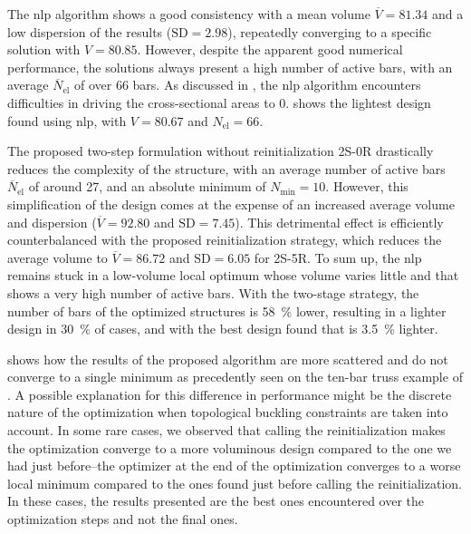 The \gls{nlp} algorithm shows a good consistency with a mean volume $\overline{V}=81.34$ and a low dispersion of the results ($\text{SD}=2.98$), repeatedly converging to a specific solution with $V=80.85$. However, despite the apparent good numerical performance, the solutions always present a high number of active bars, with an average $\overline{N}_{\text{el}}$ of over 66 bars. As discussed in , the \gls{nlp} algorithm encounters difficulties in driving the cross-sectional areas to 0.  shows the lightest design found using \gls{nlp}, with $V = 80.67$ and $N_{\text{el}}=66$.

The proposed two-step formulation without reinitialization 2S-0R drastically reduces the complexity of the structure, with an average number of active bars $\overline{N}_{\text{el}}$ of around 27, and an absolute minimum of $N_{\text{min}}=10$. However, this simplification of the design comes at the expense of an increased average volume and dispersion ($\overline{V}=92.80$ and $\text{SD}=7.45$). This detrimental effect is efficiently counterbalanced with the proposed reinitialization strategy, which reduces the average volume to $\overline{V}=86.72$ and $\text{SD}=6.05$ for 2S-5R. To sum up, the \gls{nlp} remains stuck in a low-volume local optimum whose volume varies little and that shows a very high number of active bars. With the two-stage strategy, the number of bars of the optimized structures is \qty{58}{\%} lower, resulting in a lighter design in \qty{30}{\%} of cases, and with the best design found that is \qty{3.5}{\%} lighter.

 shows how the results of the proposed algorithm are more scattered and do not converge to a single minimum as precedently seen on the ten-bar truss example of . A possible explanation for this difference in performance might be the discrete nature of the optimization when topological buckling constraints are taken into account. In some rare cases, we observed that calling the reinitialization makes the optimization converge to a more voluminous design compared to the one we had just before--\ie the optimizer at the end of the optimization converges to a worse local minimum compared to the ones found just before calling the reinitialization. In these cases, the results presented are the best ones encountered over the optimization steps and not the final ones.

